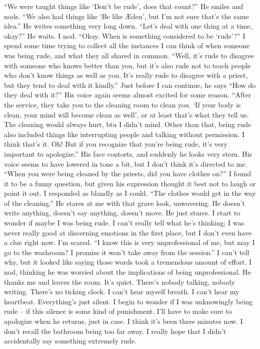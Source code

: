 \documentclass[a4paper, 12pt]{book}
\newcommand\tab[1][1cm]{\hspace*{#1}}
\newcommand\nextline{\newline\tab}
\begin{document}
\nextline
``We were taught things like `Don't be rude', does that count?'' He smiles and nods. ``We also had things like `Be like Æden', but I'm not sure that's the same idea.''
\nextline
He writes something very long down. ``Let's deal with one thing at a time, okay?'' He waits. I nod. ``Okay. When is something considered to be `rude'?''
\nextline
I spend some time trying to collect all the instances I can think of when someone was being rude, and what they all shared in common. ``Well, it's rude to disagree with someone who knows better than you, but it's also rude not to teach people who don't know things as well as you. It's really rude to disagree with a priest, but they tend to deal with it kindly.''
\nextline
Just before I can continue, he says ``How do they deal with it?'' His voice again seems almost excited for some reason.
\nextline
``After the service, they take you to the cleaning room to clean you. `If your body is clean, your mind will become clean as well', or at least that's what they tell us. The cleaning would always hurt, btu I didn't mind. Other than that, being rude also included things like interrupting people and talking without permission. I think that's it. Oh! But if you recognize that you're being rude, it's very important to apologize.''
\nextline
His face contorts, and suddenly he looks very stern. His voice seems to have lowered in tone a bit, but I don't think it's directed to me. ``When you were being cleaned by the priests, did you have clothes on?''
\nextline
I found it to be a funny question, but given his expression thought it best not to laugh or point it out. I responded as blandly as I could. ``The clothes would get in the way of the cleaning.''
\nextline
He stares at me with that grave look, unwavering. He doesn't write anything, doesn't say anything, doesn't move. He just stares. I start to wonder if maybe I was being rude. I can't really tell what he's thinking; I was never really good at discerning emotions in the first place, but I don't even have a clue right now. I'm scared.
\nextline
``I know this is very unprofessional of me, but may I go to the washroom? I promise it won't take away from the session.'' I can't tell why, but it looked like saying those words took a tremendous amount of effort. I nod, thinking he was worried about the implications of being unprofessional. He thanks me and leaves the room.
\nextline
It's quiet. There's nobody talking, nobody writing. There's no ticking clock. I can't hear myself breath. I can't hear my heartbeat. Everything's just silent. I begin to wonder if I was unknowingly being rude – if this silence is some kind of punishment. I'll have to make sure to apologize when he returns, just in case. I think it's been three minutes now. I don't recall the bathroom being too far away. I really hope that I didn't accidentally say something extremely rude.
\end{document}
